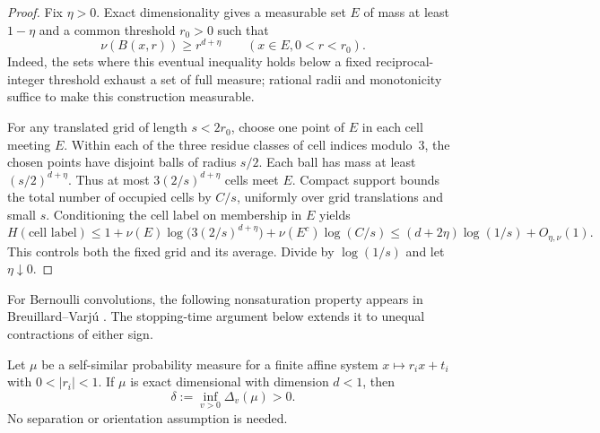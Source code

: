 \begin{proof}
Fix $\eta>0$.  Exact dimensionality gives a measurable set $E$ of mass
at least $1-\eta$ and a common threshold $r_0>0$ such that
\[
 \nu(B(x,r))\ge r^{d+\eta}
 \qquad(x\in E, 0<r<r_0).
\]
Indeed, the sets where this eventual inequality holds below a fixed
reciprocal-integer threshold exhaust a set of full measure; rational
radii and monotonicity suffice to make this construction measurable.

For any translated grid of length $s<2r_0$, choose one point of $E$ in
each cell meeting $E$.  Within each of the three residue classes of
cell indices modulo~$3$, the chosen points have disjoint balls of radius
$s/2$.  Each ball has mass at least $(s/2)^{d+\eta}$.  Thus at most
$3(2/s)^{d+\eta}$ cells meet $E$.  Compact support bounds the total
number of occupied cells by $C/s$, uniformly over grid translations
and small $s$.  Conditioning the cell label on membership in $E$ yields
\[
 H(\text{cell label})
 \le1+\nu(E)\log\bigl(3(2/s)^{d+\eta}\bigr)
       +\nu(E^c)\log(C/s)
 \le(d+2\eta)\log(1/s)+O_{\eta,\nu}(1).
\]
This controls both the fixed grid and its average.  Divide by
$\log(1/s)$ and let $\eta\downarrow0$.
\end{proof}

For Bernoulli convolutions, the following nonsaturation property appears in
Breuillard--Varj\'u \cite[Lemma~13]{BreuillardVarju2019}.
The stopping-time argument below extends it to unequal contractions of
either sign.

\begin{lemma}\label{lem:nonsaturation}
Let $\mu$ be a self-similar probability measure for a finite affine
system $x\mapsto r_i x+t_i$ with $0<|r_i|<1$.  If $\mu$ is exact
dimensional with dimension $d<1$, then
\begin{equation}\label{eq:uniform-nonsaturation}
 \delta:=\inf_{v>0}\Delta_v(\mu)>0.
\end{equation}
No separation or orientation assumption is needed.
\end{lemma}


